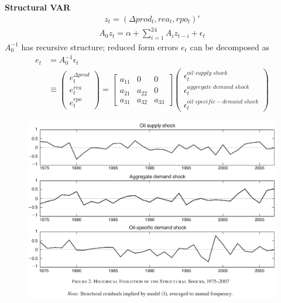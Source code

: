 \documentclass{beamer}
\begin{document}
\begin{frame}
  \textbf{Structural VAR}\\
  \begin{align}
  z_t=(\Delta prod_t, rea_t, rpo_t)'
\end{align}
\begin{align}
  A_0z_t = \alpha + \sum^{24}_{i=1}A_iz_{t-i}+\epsilon_t
\end{align}
\medskip
$A_0^{-1}$ has recursive structure; reduced form errors $e_t$ can be decomposed as
\begin{align}
  e_t&= A^{-1}_0\epsilon_t\\ \nonumber
   &\equiv \begin{pmatrix} e_t^{\Delta prod} \\ e_t^ {rea} \\ e_t^{rpo}  \end{pmatrix}
   = \begin{bmatrix}
     a_{11} & 0 & 0\\
     a_{21} & a_{22} & 0\\
     a_{31} & a_{32} & a_{33}
   \end{bmatrix}
   \begin{pmatrix}
     \epsilon_t^{oil\;supply\;shock} \\ \epsilon_t^{aggregate\;demand\;shock} \\ \epsilon_t^{oil\;specific-demand\;shock}
   \end{pmatrix}
\end{align}
\end{frame}

\begin{frame}
  \begin{figure}
    \includegraphics[scale=.7]{killian2.eps}
  \end{figure}
\end{frame}
\end{document}
